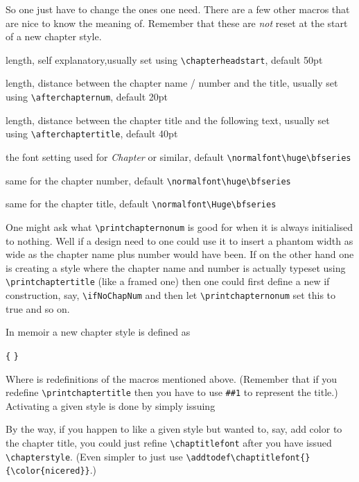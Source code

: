 So one just have to change the ones one need. There are a few other
macros that are nice to know the meaning of. Remember that these are
\emph{not} reset at the start of a new chapter style.
\begingroup
\renewcommand\descriptionlabel[1]{\hspace\labelsep\cs{#1}}
\begin{description}\firmlist
\item[beforechapskip] length, self explanatory,usually set using
  \verb+\chapterheadstart+, default 50pt
\item[midchapskip] length, distance between the chapter name / number and the
title, usually set using \verb+\afterchapternum+, default 20pt
\item[afterchapskip] length, distance between the chapter title and
  the following text, usually set using \verb+\afterchaptertitle+,
  default 40pt
\item[chapnamefont] the font setting used for \emph{Chapter} or
  similar, default \verb+\normalfont\huge\bfseries+
\item[chapnumfont] same for the chapter number, default
  \verb+\normalfont\huge\bfseries+
\item[chaptitlefont] same for the chapter title, default
  \verb+\normalfont\Huge\bfseries+ 
\end{description}
\endgroup
\noindent One might ask what \verb+\printchapternonum+ is good for
when it is always initialised to nothing. Well if a design need to one
could use it to insert a phantom width as wide as the chapter name
plus number would have been. If on the other hand one is creating a
style where the chapter name and number is actually typeset using
\verb+\printchaptertitle+ (like a framed one) then one could first
define a new if construction, say, \verb+\ifNoChapNum+ and then let
\verb+\printchapternonum+ set this to true and so on.

In memoir a new chapter style is defined as
\begin{syntax}
\texttt{\{}  
\texttt{\}}
\end{syntax}
Where  is redefinitions of the macros mentioned
above. (Remember that if you redefine \verb+\printchaptertitle+ then
you have to use \texttt{\#\#1} to represent the title.)
Activating a given style is done by simply issuing
\begin{syntax}
\end{syntax}
By the way, if you happen to like a given style but wanted to, say,
add color to the chapter title, you could just refine
\verb+\chaptitlefont+ after you have issued \verb+\chapterstyle+. (Even
simpler to just use \verb+\addtodef\chaptitlefont{}{\color{nicered}}+.)

